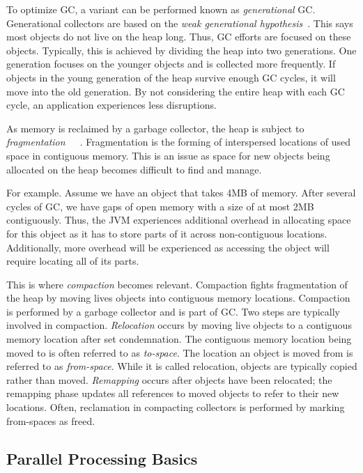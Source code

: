 \documentclass{sig-alternate}
\begin{document}
To optimize GC, a variant can be performed known as \emph{generational} GC.
Generational collectors are based on the \emph{weak generational hypothesis}~\cite{Tene:C4}.
This says most objects do not live on the 
heap long. Thus, GC efforts are focused on these objects. Typically, this is achieved
by dividing the heap into two generations. One generation focuses on the younger objects and
is collected more frequently. If objects in the young generation of the heap survive
enough GC cycles, it will move into the old generation. By not considering the entire
heap with each GC cycle, an application experiences less disruptions.

As memory is reclaimed by a garbage collector, the heap is subject to 
\emph{fragmentation}~\cite{Tene:C4}~\cite{Iyengar:Collie}~\cite{Osterlund:FPP}. Fragmentation is the forming
of interspersed locations of used space in contiguous memory. This
is an issue as space for new objects being allocated
on the heap becomes difficult to find and manage. 

For example. Assume
we have an object that takes 4MB of memory. After several cycles of GC,
we have gaps of open memory with a size of at most 2MB contiguously. Thus, 
the JVM experiences additional overhead in allocating space for this object
as it has to store parts of it across non-contiguous locations. Additionally,
more overhead will be experienced as accessing the object will require locating
all of its parts.

This is where \emph{compaction} becomes relevant. Compaction fights
fragmentation of the heap by moving lives objects into contiguous memory locations.
Compaction is performed by a garbage collector and is part of GC. Two steps
are typically involved in compaction. \emph{Relocation} occurs by moving live objects
to a contiguous memory location after set condemnation.
The contiguous memory location being moved to is often referred to as \emph{to-space}.
The location an object is moved from is referred to as \emph{from-space}. While it is called 
relocation, objects are typically copied rather than moved. \emph{Remapping}
occurs after objects have been relocated; the remapping phase 
updates all references to moved objects to refer to their new locations. Often, reclamation
in compacting collectors is performed by marking from-spaces as freed.


\subsection{Parallel Processing Basics}
\label{sec:parallelProcessing}
\end{document}
